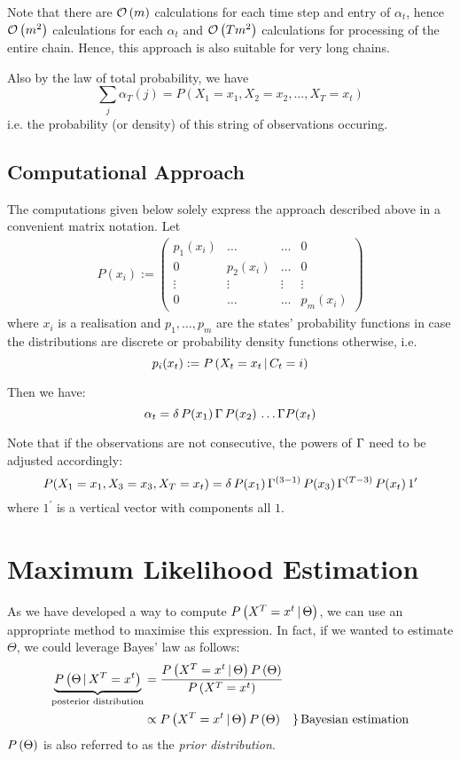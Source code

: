 Note that there are $\mathcal{O}\left(m\right)$ calculations for each time step and entry of $\alpha_t$, hence $\mathcal{O}\left(m^2\right)$ calculations for each $\alpha_t$ and $\mathcal{O}\left(T m^2\right)$ calculations for processing of the entire chain. Hence, this approach is also suitable for very long chains.
 
Also by the law of total probability, we have
\[
\sum_j \alpha_T(j) = P\left(X_1 = x_1, X_2 = x_2, \dots, X_T = x_t \right)
\] 
i.e. the probability (or density) of this string of observations occuring. 


\subsection{Computational Approach}

The computations given below solely express the approach described above in a convenient matrix notation. 
Let 
\begin{align*}
	P(x_i) := \begin{pmatrix}
		p_1(x_i) & \dots    & \dots & 0  \\
		0        & p_2(x_i) & \dots & 0  \\
		\vdots   & \vdots   & \vdots& \vdots \\ 
		0        & \dots    & \dots & p_m(x_i)
	\end{pmatrix}
\end{align*}
where $x_i$ is a realisation and $p_1, \dots, p_m$ are the states' probability functions in case the distributions are discrete or probability density functions otherwise, i.e.
\[
	p_i(x_t) := P\left(X_t = x_t \, | \, C_t = i\right)
\]

Then we have:
\[
\alpha_t = \delta \, P(x_1) \, \Gamma \, P(x_2) \, \dots \Gamma P(x_t)
\]

Note that if the observations are not consecutive, the powers of $\Gamma$ need to be adjusted accordingly:
\[
P(X_1 = x_1, X_3 = x_3, X_T = x_t) = \delta \,  P(x_1) \, \Gamma^{(3-1)} \,  P(x_3) \,  \Gamma^{(T-3)} \, P(x_t) \, 1^\prime
\]
where $1^\prime$ is a vertical vector with components all $1$. 



\section{Maximum Likelihood Estimation}

As we have developed a way to compute $P\left(X^T=x^t \, | \, \Theta\right)$, we can use an appropriate method to maximise this expression. In fact, if we wanted to estimate $\Theta$, we could leverage Bayes' law as follows:
\begin{align}
	\underbrace{P\left(\Theta \, | \, X^T=x^t\right)}_{\text{posterior distribution}} &= \frac{P\left(X^T=x^t \, | \, \Theta\right) P \left(\Theta\right)}{P \left(X^T=x^t\right)} \\
		&\propto P\left(X^T=x^t \, | \, \Theta\right) P \left(\Theta\right)  \quad \} \, \text{Bayesian estimation} 
	\label{bay_estimate}
\end{align}
$P \left(\Theta\right)$ is also referred to as the \textit{prior distribution}.

